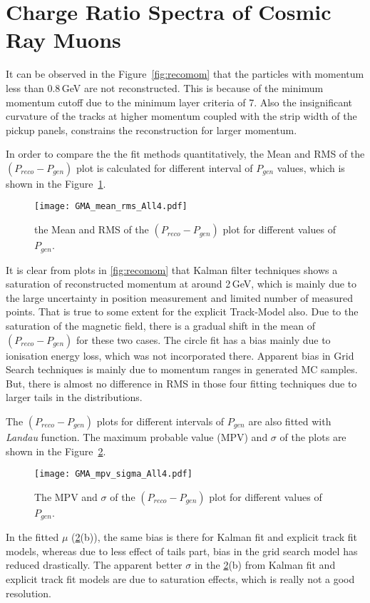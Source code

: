 \section{Charge Ratio Spectra of Cosmic Ray Muons}
\label{section:multiresult}

It can be observed in the Figure~\ref{fig:recomom} that the particles
with momentum less than 0.8\,GeV are not reconstructed. This is because
of the minimum momentum cutoff due to the minimum layer criteria of 7.
Also the insignificant curvature of the tracks at higher momentum
coupled with the strip width of the pickup panels, constrains the
reconstruction for larger momentum.

In order to compare the the fit methods quantitatively, the Mean and
RMS of the $\left(P_{reco}-P_{gen}\right)$ plot is calculated for
different interval of $P_{gen}$ values, which is shown in the
Figure~\ref{fig:meanrms}.
\begin{figure}[h]
  \centering
  \texttt{[image: GMA\_mean\_rms\_All4.pdf]}
  \caption{the Mean and RMS of the $\left(P_{reco}-P_{gen}\right)$ plot
    for different values of $P_{gen}$.}
  \label{fig:meanrms}
\end{figure}
It is clear from plots in \ref{fig:recomom} that Kalman filter techniques shows
a saturation of reconstructed momentum at around 2\,GeV, which is mainly due to
the large uncertainty in position measurement and limited number of measured points.
That is true to some extent for the explicit Track-Model also. Due to the saturation
of the magnetic field, there is a gradual shift in the mean of  $\left(P_{reco}-P_{gen}\right)$
for these two cases. The circle fit has a bias mainly due to ionisation energy loss, which
was not incorporated there. Apparent bias in Grid Search techniques is mainly due to
momentum ranges in generated MC samples. But, there is almost no difference in RMS in
those four fitting techniques due to larger tails in the distributions.

The $\left(P_{reco}-P_{gen}\right)$ plots for different intervals of
$P_{gen}$ are also fitted with {\it Landau} function. The maximum
probable value (MPV) and $\sigma$ of the plots are shown in the
Figure~\ref{fig:mpvsigma}.
\begin{figure}[h]
  \centering
  \texttt{[image: GMA\_mpv\_sigma\_All4.pdf]}
  \caption{The MPV and $\sigma$ of the $\left(P_{reco}-P_{gen}\right)$
    plot for different values of $P_{gen}$.}
  \label{fig:mpvsigma}
\end{figure}
In the fitted $\mu$ (\ref{fig:mpvsigma}(b)), the same bias is there for Kalman fit
and explicit track fit models, whereas due to less effect of tails part, bias in
the grid search model has reduced drastically. The apparent better $\sigma$ in
the \ref{fig:mpvsigma}(b) from Kalman fit and explicit track fit models are due to
saturation effects, which is really not a good resolution.

